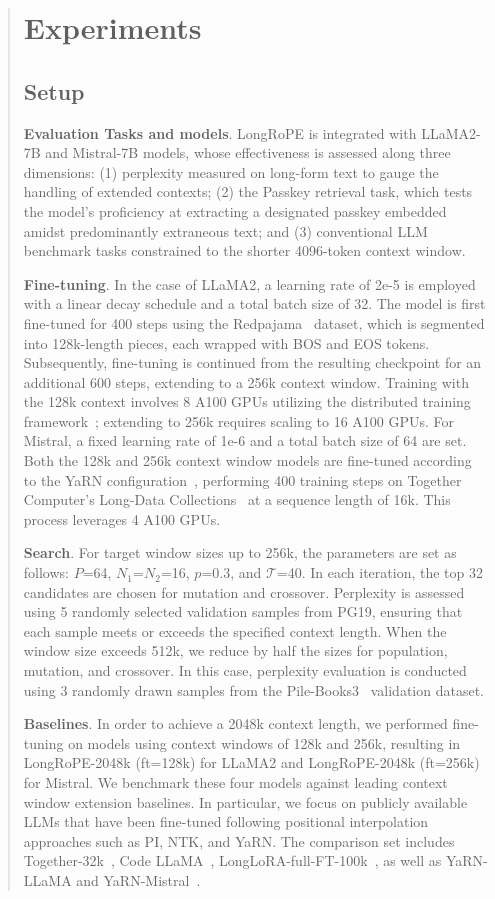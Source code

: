 \begin{abstract}
 \section{Experiments}

\label{sec:exp}
\subsection{Setup}
\textbf{Evaluation Tasks and models}. LongRoPE is integrated with LLaMA2-7B and Mistral-7B models, whose effectiveness is assessed along three dimensions: (1) perplexity measured on long-form text to gauge the handling of extended contexts; (2) the Passkey retrieval task, which tests the model’s proficiency at extracting a designated passkey embedded amidst predominantly extraneous text; and (3) conventional LLM benchmark tasks constrained to the shorter 4096-token context window.

\textbf{Fine-tuning}. In the case of LLaMA2, a learning rate of 2e-5 is employed with a linear decay schedule and a total batch size of 32. The model is first fine-tuned for 400 steps using the Redpajama~\cite{redpajama} dataset, which is segmented into 128k-length pieces, each wrapped with BOS and EOS tokens. Subsequently, fine-tuning is continued from the resulting checkpoint for an additional 600 steps, extending to a 256k context window. Training with the 128k context involves 8 A100 GPUs utilizing the distributed training framework~\cite{cube}; extending to 256k requires scaling to 16 A100 GPUs. For Mistral, a fixed learning rate of 1e-6 and a total batch size of 64 are set. Both the 128k and 256k context window models are fine-tuned according to the YaRN configuration~\cite{yarn}, performing 400 training steps on Together Computer’s Long-Data Collections~\cite{mistraldata} at a sequence length of 16k. This process leverages 4 A100 GPUs.

\textbf{Search}. For target window sizes up to 256k, the parameters are set as follows: $P$=64, $N_1$=$N_2$=16, $p$=0.3, and $\mathcal{T}$=40. In each iteration, the top 32 candidates are chosen for mutation and crossover. Perplexity is assessed using 5 randomly selected validation samples from PG19, ensuring that each sample meets or exceeds the specified context length. When the window size exceeds 512k, we reduce by half the sizes for population, mutation, and crossover. In this case, perplexity evaluation is conducted using 3 randomly drawn samples from the Pile-Books3~\cite{pile} validation dataset.

\textbf{Baselines}. In order to achieve a 2048k context length, we performed fine-tuning on models using context windows of 128k and 256k, resulting in LongRoPE-2048k (ft=128k) for LLaMA2 and LongRoPE-2048k (ft=256k) for Mistral. We benchmark these four models against leading context window extension baselines. In particular, we focus on publicly available LLMs that have been fine-tuned following positional interpolation approaches such as PI, NTK, and YaRN. The comparison set includes Together-32k~\cite{together}, Code LLaMA~\cite{codellama}, LongLoRA-full-FT-100k~\cite{longlora}, as well as YaRN-LLaMA and YaRN-Mistral~\cite{yarn}.


\end{abstract}
